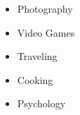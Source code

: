 \begin{itemize}
	\item Photography
	\item Video Games
	\item Traveling
	\item Cooking
	\item Psychology
\end{itemize}
